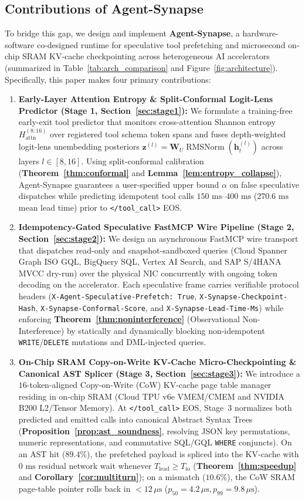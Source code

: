 \documentclass[10pt,conference]{IEEEtran}
\begin{document}
\subsection{Contributions of Agent-Synapse}
To bridge this gap, we design and implement \textbf{Agent-Synapse}, a hardware-software co-designed runtime for speculative tool prefetching and microsecond on-chip SRAM KV-cache checkpointing across heterogeneous AI accelerators (summarized in Table~\ref{tab:arch_comparison} and Figure~\ref{fig:architecture}). Specifically, this paper makes four primary contributions:
\begin{enumerate}
    \item \textbf{Early-Layer Attention Entropy \& Split-Conformal Logit-Lens Predictor (Stage 1, Section~\ref{sec:stage1}):} We formulate a training-free early-exit tool predictor that monitors cross-attention Shannon entropy $H_{\text{attn}}^{(8:16)}$ over registered tool schema token spans and fuses depth-weighted logit-lens unembedding posteriors $\mathbf{z}^{(l)} = \mathbf{W}_U \operatorname{RMSNorm}(\mathbf{h}_t^{(l)})$ across layers $l \in [8, 16]$. Using split-conformal calibration (\textbf{Theorem~\ref{thm:conformal}} and \textbf{Lemma~\ref{lem:entropy_collapse}}), Agent-Synapse guarantees a user-specified upper bound $\alpha$ on false speculative dispatches while predicting idempotent tool calls $150\text{ ms}$--$400\text{ ms}$ ($270.6\text{ ms}$ mean lead time) prior to \texttt{</tool\_call>} EOS.
    \item \textbf{Idempotency-Gated Speculative FastMCP Wire Pipeline (Stage 2, Section~\ref{sec:stage2}):} We design an asynchronous FastMCP wire transport that dispatches read-only and snapshot-sandboxed queries (Cloud Spanner Graph ISO GQL, BigQuery SQL, Vertex AI Search, and SAP S/4HANA MVCC dry-run) over the physical NIC concurrently with ongoing token decoding on the accelerator. Each speculative frame carries verifiable protocol headers (\texttt{X-Agent-Speculative-Prefetch: True}, \texttt{X-Synapse-Checkpoint-Hash}, \texttt{X-Synapse-Conformal-Score}, and \texttt{X-Synapse-Lead-Time-Ms}) while enforcing \textbf{Theorem~\ref{thm:noninterference}} (Observational Non-Interference) by statically and dynamically blocking non-idempotent \texttt{WRITE}/\texttt{DELETE} mutations and DML-injected queries.
    \item \textbf{On-Chip SRAM Copy-on-Write KV-Cache Micro-Checkpointing \& Canonical AST Splicer (Stage 3, Section~\ref{sec:stage3}):} We introduce a $16$-token-aligned Copy-on-Write (CoW) KV-cache page table manager residing in on-chip SRAM (Cloud TPU v6e VMEM/CMEM and NVIDIA B200 L2/Tensor Memory). At \texttt{</tool\_call>} EOS, Stage~3 normalizes both predicted and emitted calls into canonical Abstract Syntax Trees (\textbf{Proposition~\ref{prop:ast_soundness}}, resolving JSON key permutations, numeric representations, and commutative SQL/GQL \texttt{WHERE} conjuncts). On an AST hit ($89.4\%$), the prefetched payload is spliced into the KV-cache with $0\text{ ms}$ residual network wait whenever $T_{\text{lead}} \ge T_{\text{io}}$ (\textbf{Theorem~\ref{thm:speedup}} and \textbf{Corollary~\ref{cor:multiturn}}); on a mismatch ($10.6\%$), the CoW SRAM page-table pointer rolls back in $< 12\,\mu\text{s}$ ($p_{50} = 4.2\,\mu\text{s}, p_{99} = 9.8\,\mu\text{s}$).

\end{enumerate}
\end{document}
